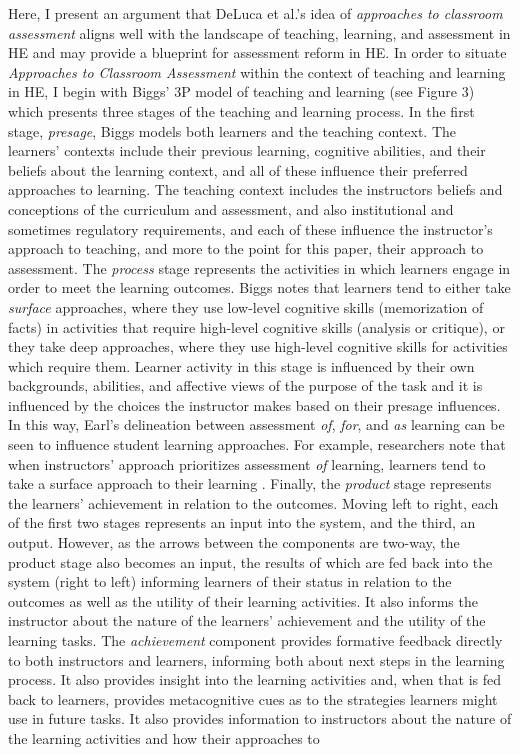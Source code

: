 \documentclass[
]{book}
\begin{document}
Here, I present an argument that DeLuca et al.'s idea of \emph{approaches to classroom assessment} \citeyearpar{delucaApproachesClassroomAssessment2016} aligns well with the landscape of teaching, learning, and assessment in HE and may provide a blueprint for assessment reform in HE. In order to situate \emph{Approaches to Classroom Assessment} within the context of teaching and learning in HE, I begin with Biggs' \citep{biggsWhatStudentDoes1999, biggsTheoryPracticeCognitive1993} 3P model of teaching and learning (see Figure 3) which presents three stages of the teaching and learning process. In the first stage, \emph{presage}, Biggs models both learners and the teaching context. The learners' contexts include their previous learning, cognitive abilities, and their beliefs about the learning context, and all of these influence their preferred approaches to learning. The teaching context includes the instructors beliefs and conceptions of the curriculum and assessment, and also institutional and sometimes regulatory requirements, and each of these influence the instructor's approach to teaching, and more to the point for this paper, their approach to assessment. The \emph{process} stage represents the activities in which learners engage in order to meet the learning outcomes. Biggs notes that learners tend to either take \emph{surface} approaches, where they use low-level cognitive skills (memorization of facts) in activities that require high-level cognitive skills (analysis or critique), or they take deep approaches, where they use high-level cognitive skills for activities which require them. Learner activity in this stage is influenced by their own backgrounds, abilities, and affective views of the purpose of the task and it is influenced by the choices the instructor makes based on their presage influences. In this way, Earl's \citeyearpar{earlAssessmentLearningUsing2013} delineation between assessment \emph{of}, \emph{for}, and \emph{as} learning can be seen to influence student learning approaches. For example, researchers note that when instructors' approach prioritizes assessment \emph{of} learning, learners tend to take a surface approach to their learning \citep{birenbaumAssessmentInstructionPreferences2007}. Finally, the \emph{product} stage represents the learners' achievement in relation to the outcomes. Moving left to right, each of the first two stages represents an input into the system, and the third, an output. However, as the arrows between the components are two-way, the product stage also becomes an input, the results of which are fed back into the system (right to left) informing learners of their status in relation to the outcomes as well as the utility of their learning activities. It also informs the instructor about the nature of the learners' achievement and the utility of the learning tasks. The \emph{achievement} component provides formative feedback directly to both instructors and learners, informing both about next steps in the learning process. It also provides insight into the learning activities and, when that is fed back to learners, provides metacognitive cues as to the strategies learners might use in future tasks. It also provides information to instructors about the nature of the learning activities and how their approaches to 
\end{document}
